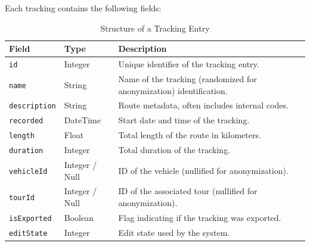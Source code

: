\documentclass[a4paper,12pt,twoside]{scrreprt}
\begin{document}
Each tracking contains the following fields:
\begin{table}[H]
  \centering
  \caption{Structure of a Tracking Entry}
  \label{tab:tracking_structure}
  \begin{tabular}{|l|l|p{8cm}|}
    \hline
    \textbf{Field}       & \textbf{Type}  & \textbf{Description}
    \\
    \hline
    \texttt{id}          & Integer        & Unique identifier of the tracking
    entry.

    \\
    \hline
    \texttt{name}        & String         & Name of the tracking (randomized
    for anonymization)
    identification.
    \\
    \hline
    \texttt{description} & String         & Route metadata, often includes
    internal codes.
    \\
    \hline
    \texttt{recorded}    & DateTime       & Start date and time of the
    tracking.
    \\
    \hline
    \texttt{length}      & Float          & Total length of the route in
    kilometers.
    \\
    \hline
    \texttt{duration}    & Integer        & Total duration of the tracking.
    \\
    \hline
    \texttt{vehicleId}   & Integer / Null & ID of the vehicle (nullified for
    anonymization).
    \\
    \hline
    \texttt{tourId}      & Integer / Null & ID of the associated tour
    (nullified for anonymization).
    \\
    \hline
    \texttt{isExported}  & Boolean        & Flag indicating if the tracking was
    exported.
    \\
    \hline
    \texttt{editState}   & Integer        & Edit state used by the system.
    \\
    \hline
  \end{tabular}
\end{table}
\end{document}
